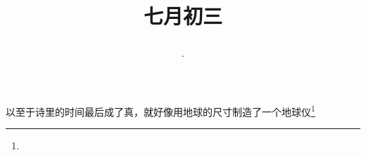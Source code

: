 \title{\date[d=6,m=8,y=2024][year:cn-y,年,month:cn,day:cn,日,·,weekday]·七月初三 }
以至于诗里的时间最后成了真，就好像用地球的尺寸制造了一个地球仪\footnote{ }

